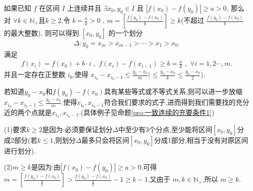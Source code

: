 \documentclass[lang=cn,newtx,10pt,scheme=chinese]{../Template/elegantbook}
\begin{document}
\begin{proposition}\label{pro:连续函数在固定的两点之间寻找充分近的两点,同时保持两点函数值之差足够大}
    如果已知 \(f\) 在区间 \(I\) 上连续并且 \(\exists x_0,y_0\in I\) 且 \(\left| f\left( x_0 \right) -f\left( y_0 \right) \right|\geqslant  a>0\),
    那么对 \(\forall k\in \mathbb{N} _+\)且$k\ge2$,令 \(b = \frac{a}{k}>0\)\,\,,\,\,\(m=\left[ \frac{f\left( y_0 \right) -f\left( x_0 \right)}{b} \right]\geqslant  k\)(不超过 \(\frac{f\left( y_0 \right) -f\left( x_0 \right)}{b}\) 的最大整数).
则可以得到 \(\left[ x_0,y_0 \right]\) 的一个划分 
\begin{align*}
\Delta :y_0=x_m>x_{m - 1}>\cdots >x_1>x_0.
\end{align*}
满足 \begin{align*}
    f\left( x_i \right) = f\left( x_0 \right) + b\cdot i\,\,,\,\,f\left( x_i \right) - f\left( x_{i - 1} \right) \geqslant  b=\frac{a}{k}\,\,,\,\,\forall i = 1,2\cdots,m.
\end{align*}
并且一定存在正整数 \(i_0\),使得 \(x_{i_0}-x_{i_0 - 1}\leqslant  \frac{y_0 - x_0}{m}(\leqslant  \frac{y_0 - x_0}{k}\leqslant  \frac{y_0 - x_0}{2}\)).
\end{proposition}
\begin{remark}
    若知道$y_0-x_0$和$f(y_0)-f(x_0)$具有某些等式或不等式关系,则可以进一步放缩\(x_{i_0}-x_{i_0 - 1}\leqslant  \frac{y_0 - x_0}{m}\).使得$x_{i_0},x_{i_0 - 1}$符合我们要求的式子,进而得到我们需要找的充分近的两个点就是$x_{i_0},x_{i_0 - 1}$.(具体例子见命题\ref{pro:一致连续的充要条件1})
\end{remark}
\begin{note}
   (1)要求$k\ge2$是因为:必须要保证划分$\Delta$中至少有3个分点,至少能将区间$[x_0,y_0]$分成2部分(若$k\le1$,则划分$\Delta$最多只会将区间$[x_0,y_0]$分成1部分,相当于没有对原区间进行划分).

   (2)$m\geqslant  k$是因为:由\(\left| f\left( x_0 \right) -f\left( y_0 \right) \right|\geqslant  a>0\),可得\(m=\left[ \frac{f\left( y_0 \right) -f\left( x_0 \right)}{\frac{a}{k}} \right] >\frac{f\left( y_0 \right) -f\left( x_0 \right)}{\frac{a}{k}} - 1\geqslant  k - 1\),又由于 \(m,k\in \mathbb{N} _+\),所以 \(m\geqslant  k\).
\end{note} 
\end{document}
